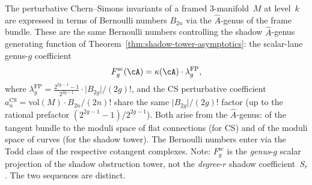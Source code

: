 \begin{remark}
\label{rem:cs-bernoulli}
The perturbative Chern--Simons invariants of a framed
$3$-manifold~$M$ at level~$k$ are expressed in terms of
Bernoulli numbers $B_{2n}$ via the $\hat{A}$-genus of the
frame bundle. These are the same Bernoulli
numbers controlling the shadow $\hat{A}$-genus
generating function of
Theorem~\ref{thm:shadow-tower-asymptotics}: the
scalar-lane genus-$g$ coefficient
\[
F_g^{\mathrm{sc}}(\cA)
=\kappa(\cA)\cdot\lambda_g^{\mathrm{FP}},
\]
where $\lambda_g^{\mathrm{FP}} = \tfrac{2^{2g-1}-1}{2^{2g-1}}\cdot
\lvert B_{2g}\rvert/(2g)!$, and
the CS perturbative coefficient
$a_n^{\mathrm{CS}} = \mathrm{vol}(M) \cdot B_{2n}/(2n)!$
share the same $\lvert B_{2g}\rvert/(2g)!$ factor
\textup{(}up to the rational prefactor
$(2^{2g-1}-1)/2^{2g-1}$\textup{)}.
Both arise from the $\hat{A}$-genus: of the
tangent bundle to the moduli space of flat connections
(for CS) and of the moduli space of curves (for the shadow
tower). The Bernoulli numbers enter via the Todd
class of the respective cotangent complexes.
Note: $F_g^{\mathrm{sc}}$ is the \emph{genus}-$g$ scalar
projection of the shadow obstruction tower, not the
\emph{degree}-$r$ shadow coefficient~$S_r$. The two
sequences are distinct.
\end{remark}

